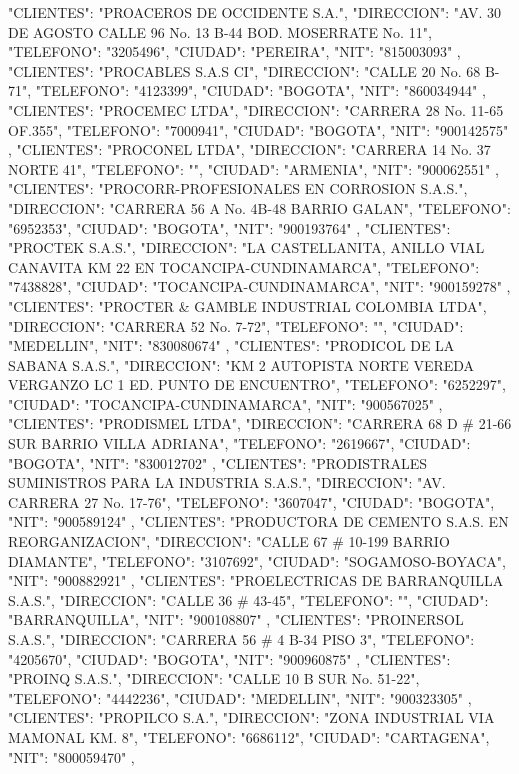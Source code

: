    {
   "CLIENTES": "PROACEROS DE OCCIDENTE S.A.",
   "DIRECCION": "AV. 30 DE AGOSTO CALLE 96 No. 13 B-44 BOD. MOSERRATE No. 11",
   "TELEFONO": "3205496",
   "CIUDAD": "PEREIRA",
   "NIT": "815003093"
   },
   {
   "CLIENTES": "PROCABLES S.A.S CI",
   "DIRECCION": "CALLE 20 No. 68 B-71",
   "TELEFONO": "4123399",
   "CIUDAD": "BOGOTA",
   "NIT": "860034944"
   },
   {
   "CLIENTES": "PROCEMEC LTDA",
   "DIRECCION": "CARRERA 28 No. 11-65 OF.355",
   "TELEFONO": "7000941",
   "CIUDAD": "BOGOTA",
   "NIT": "900142575"
   },
   {
   "CLIENTES": "PROCONEL LTDA",
   "DIRECCION": "CARRERA 14 No. 37 NORTE 41",
   "TELEFONO": "",
   "CIUDAD": "ARMENIA",
   "NIT": "900062551"
   },
   {
   "CLIENTES": "PROCORR-PROFESIONALES EN CORROSION S.A.S.",
   "DIRECCION": "CARRERA 56 A No. 4B-48 BARRIO GALAN",
   "TELEFONO": "6952353",
   "CIUDAD": "BOGOTA",
   "NIT": "900193764"
   },
   {
   "CLIENTES": "PROCTEK S.A.S.",
   "DIRECCION": "LA CASTELLANITA, ANILLO VIAL CANAVITA KM 22 EN TOCANCIPA-CUNDINAMARCA",
   "TELEFONO": "7438828",
   "CIUDAD": "TOCANCIPA-CUNDINAMARCA",
   "NIT": "900159278"
   },
   {
   "CLIENTES": "PROCTER & GAMBLE INDUSTRIAL COLOMBIA LTDA",
   "DIRECCION": "CARRERA 52 No. 7-72",
   "TELEFONO": "",
   "CIUDAD": "MEDELLIN",
   "NIT": "830080674"
   },
   {
   "CLIENTES": "PRODICOL DE LA SABANA S.A.S.",
   "DIRECCION": "KM 2 AUTOPISTA NORTE VEREDA VERGANZO LC 1 ED. PUNTO DE ENCUENTRO",
   "TELEFONO": "6252297",
   "CIUDAD": "TOCANCIPA-CUNDINAMARCA",
   "NIT": "900567025"
   },
   {
   "CLIENTES": "PRODISMEL LTDA",
   "DIRECCION": "CARRERA 68 D # 21-66 SUR BARRIO VILLA ADRIANA",
   "TELEFONO": "2619667",
   "CIUDAD": "BOGOTA",
   "NIT": "830012702"
   },
   {
   "CLIENTES": "PRODISTRALES SUMINISTROS PARA LA INDUSTRIA S.A.S.",
   "DIRECCION": "AV. CARRERA 27 No. 17-76",
   "TELEFONO": "3607047",
   "CIUDAD": "BOGOTA",
   "NIT": "900589124"
   },
   {
   "CLIENTES": "PRODUCTORA DE CEMENTO S.A.S. EN REORGANIZACION",
   "DIRECCION": "CALLE 67 # 10-199 BARRIO DIAMANTE",
   "TELEFONO": "3107692",
   "CIUDAD": "SOGAMOSO-BOYACA",
   "NIT": "900882921"
   },
   {
   "CLIENTES": "PROELECTRICAS DE BARRANQUILLA S.A.S.",
   "DIRECCION": "CALLE 36 # 43-45",
   "TELEFONO": "",
   "CIUDAD": "BARRANQUILLA",
   "NIT": "900108807"
   },
   {
   "CLIENTES": "PROINERSOL S.A.S.",
   "DIRECCION": "CARRERA 56 # 4 B-34 PISO 3",
   "TELEFONO": "4205670",
   "CIUDAD": "BOGOTA",
   "NIT": "900960875"
   },
   {
   "CLIENTES": "PROINQ S.A.S.",
   "DIRECCION": "CALLE 10 B SUR No. 51-22",
   "TELEFONO": "4442236",
   "CIUDAD": "MEDELLIN",
   "NIT": "900323305"
   },
   {
   "CLIENTES": "PROPILCO S.A.",
   "DIRECCION": "ZONA INDUSTRIAL VIA MAMONAL KM. 8",
   "TELEFONO": "6686112",
   "CIUDAD": "CARTAGENA",
   "NIT": "800059470"
   },
